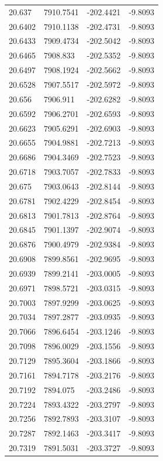 \begin{table}[H]
\begin{tabular}{llll}
20.637 & 7910.7541 & -202.4421 & -9.8093 \\
20.6402 & 7910.1138 & -202.4731 & -9.8093 \\
20.6433 & 7909.4734 & -202.5042 & -9.8093 \\
20.6465 & 7908.833 & -202.5352 & -9.8093 \\
20.6497 & 7908.1924 & -202.5662 & -9.8093 \\
20.6528 & 7907.5517 & -202.5972 & -9.8093 \\
20.656 & 7906.911 & -202.6282 & -9.8093 \\
20.6592 & 7906.2701 & -202.6593 & -9.8093 \\
20.6623 & 7905.6291 & -202.6903 & -9.8093 \\
20.6655 & 7904.9881 & -202.7213 & -9.8093 \\
20.6686 & 7904.3469 & -202.7523 & -9.8093 \\
20.6718 & 7903.7057 & -202.7833 & -9.8093 \\
20.675 & 7903.0643 & -202.8144 & -9.8093 \\
20.6781 & 7902.4229 & -202.8454 & -9.8093 \\
20.6813 & 7901.7813 & -202.8764 & -9.8093 \\
20.6845 & 7901.1397 & -202.9074 & -9.8093 \\
20.6876 & 7900.4979 & -202.9384 & -9.8093 \\
20.6908 & 7899.8561 & -202.9695 & -9.8093 \\
20.6939 & 7899.2141 & -203.0005 & -9.8093 \\
20.6971 & 7898.5721 & -203.0315 & -9.8093 \\
20.7003 & 7897.9299 & -203.0625 & -9.8093 \\
20.7034 & 7897.2877 & -203.0935 & -9.8093 \\
20.7066 & 7896.6454 & -203.1246 & -9.8093 \\
20.7098 & 7896.0029 & -203.1556 & -9.8093 \\
20.7129 & 7895.3604 & -203.1866 & -9.8093 \\
20.7161 & 7894.7178 & -203.2176 & -9.8093 \\
20.7192 & 7894.075 & -203.2486 & -9.8093 \\
20.7224 & 7893.4322 & -203.2797 & -9.8093 \\
20.7256 & 7892.7893 & -203.3107 & -9.8093 \\
20.7287 & 7892.1463 & -203.3417 & -9.8093 \\
20.7319 & 7891.5031 & -203.3727 & -9.8093 \\

\end{tabular}
\end{table}
